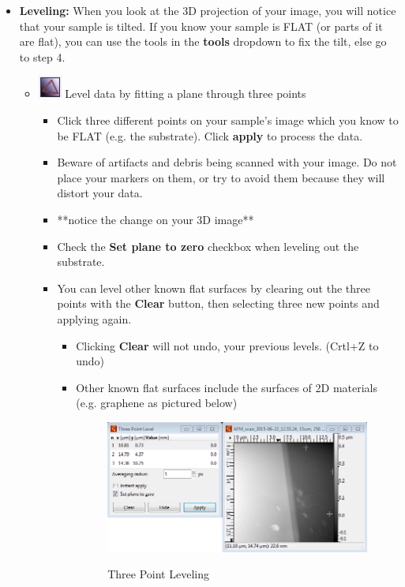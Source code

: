 \documentclass{../lab}
\begin{document}
\begin{itemize}
    \item\textbf{Leveling:} When you look at the 3D projection of your image, you will notice that your sample is tilted. If you know your sample is FLAT (or parts of it are flat), you can use the tools in the \textbf{tools} dropdown to fix the tilt, else go to step 4.
    \begin{itemize}
        \item \includegraphics[height=2em]{images/44.png} Level data by fitting a plane through three points
        \begin{itemize}
            \item Click three different points on your sample's image which you know to be FLAT (e.g. the substrate). Click \textbf{apply} to process the data.
            
            \item Beware of artifacts and debris being scanned with your image.  Do not place your markers on them, or try to avoid them because they will distort your data.
            
            \item **notice the change on your 3D image**
            
            \item Check the \textbf{Set plane to zero} checkbox when leveling out the substrate.
            
            \item You can level other known flat surfaces by clearing out the three points with the \textbf{Clear} button, then selecting three new points and applying again.
            \begin{itemize}
                \item Clicking \textbf{Clear} will not undo, your previous levels. (Crtl+Z to undo)
                
                \item Other known flat surfaces include the surfaces of 2D materials (e.g. graphene as pictured below)
                \begin{figure}[H]
                    \centering
                    \href{http://experimentationlab.berkeley.edu/sites/default/files/AFMImages/45.png}{\includegraphics[width=0.8\linewidth]{images/45.png}}
                    \caption{Three Point Leveling}
                \end{figure}
            \end{itemize}
            

\end{itemize}
\end{itemize}
\end{itemize}
\end{document}
